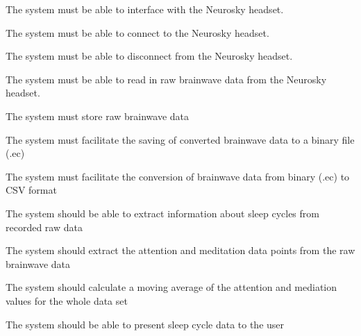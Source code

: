 \begin{reqtable}
  \reqheader

  {The system must be able to interface with the Neurosky headset.}
  \phigh
  \deps{\ref{sreq:connect-headset}, \ref{sreq:disconnect-headset}, \ref{sreq:read-data-headset}}

  {The system must be able to connect to the Neurosky headset.}
  \phigh

  {The system must be able to disconnect from the Neurosky headset.}
  \phigh
  \deps{\ref{sreq:connect-headset}}

  {The system must be able to read in raw brainwave data from the Neurosky headset.}
  \phigh
  \deps{\ref{sreq:connect-headset}}

  {The system must store raw brainwave data}
  \phigh
  \deps{\ref{sreq:facilitate-saving},\ref{sreq:facilitate-conversion}}

  {The system must facilitate the saving of converted brainwave data to a binary file (.ec)}
  \phigh
  \deps{\ref{sreq:read-data-headset}}

  {The system must facilitate the conversion of brainwave data from binary (.ec) to CSV format}
  \phigh
  \deps{\ref{sreq:facilitate-saving}}

  {The system should be able to extract information about sleep cycles from recorded raw data}
  \phigh
  \deps{\ref{sreq:extract-attention-mediation},\ref{sreq:calcutate-moving-average}}

  {The system should extract the attention and meditation data points from the raw brainwave data}
  \phigh
  \deps{\ref{req:store-Data}}

  {The system should calculate a moving average of the attention and mediation values for the whole data set}
  \phigh
  \deps{\ref{sreq:extract-attention-mediation}}

  {The system should be able to present sleep cycle data to the user}
  \phigh
  \deps{\ref{sreq:present-data-table},\ref{sreq:present-hypnogram}}


\end{reqtable}
